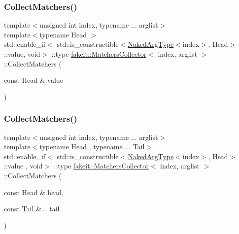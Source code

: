 \subsubsection{\texorpdfstring{CollectMatchers()}{CollectMatchers()}\hspace{0.1cm}{\footnotesize\ttfamily [2/63]}}
{\footnotesize\ttfamily template$<$unsigned int index, typename ... arglist$>$ \\
template$<$typename Head $>$ \\
std\+::enable\+\_\+if$<$ std\+::is\+\_\+constructible$<$\mbox{\hyperlink{classfakeit_1_1MatchersCollector_aeda8ced6a2f0cb7c6e4f916f18a91730}{Naked\+Arg\+Type}}$<$index$>$, Head$>$\+::value, void$>$ \+::type \mbox{\hyperlink{classfakeit_1_1MatchersCollector}{fakeit\+::\+Matchers\+Collector}}$<$ index, arglist $>$\+::Collect\+Matchers (\begin{DoxyParamCaption}\item[{const Head \&}]{value }\end{DoxyParamCaption})\hspace{0.3cm}{\ttfamily [inline]}}

\mbox{\label{classfakeit_1_1MatchersCollector_ab7d1bf17a18f483ebc763f5d6793392d}} 
\subsubsection{\texorpdfstring{CollectMatchers()}{CollectMatchers()}\hspace{0.1cm}{\footnotesize\ttfamily [3/63]}}
{\footnotesize\ttfamily template$<$unsigned int index, typename ... arglist$>$ \\
template$<$typename Head , typename ... Tail$>$ \\
std\+::enable\+\_\+if$<$ std\+::is\+\_\+constructible$<$\mbox{\hyperlink{classfakeit_1_1MatchersCollector_aeda8ced6a2f0cb7c6e4f916f18a91730}{Naked\+Arg\+Type}}$<$index$>$, Head$>$\+::value , void$>$ \+::type \mbox{\hyperlink{classfakeit_1_1MatchersCollector}{fakeit\+::\+Matchers\+Collector}}$<$ index, arglist $>$\+::Collect\+Matchers (\begin{DoxyParamCaption}\item[{const Head \&}]{head,  }\item[{const Tail \&...}]{tail }\end{DoxyParamCaption})\hspace{0.3cm}{\ttfamily [inline]}}


